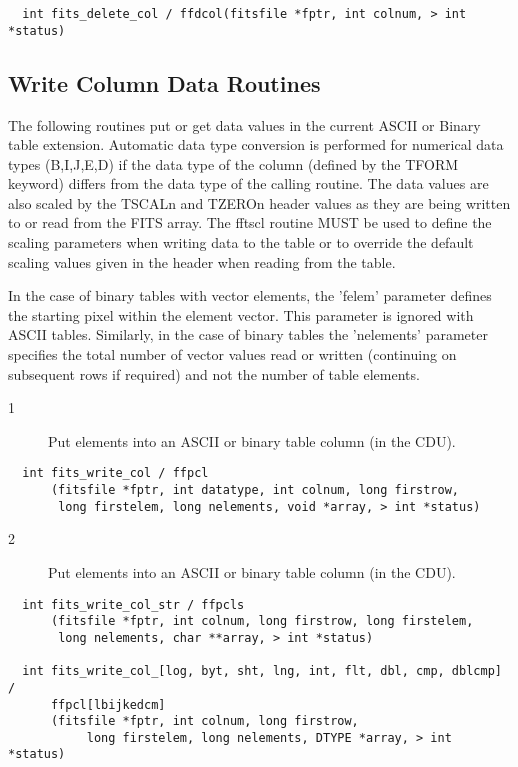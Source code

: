 \begin{verbatim}
  int fits_delete_col / ffdcol(fitsfile *fptr, int colnum, > int *status)
\end{verbatim}

\subsection{ Write Column Data Routines \label{FFPCLS}}

The following routines put or get data values in the current ASCII or
Binary table extension.  Automatic data type conversion is performed
for numerical data types (B,I,J,E,D) if the data type of the column
(defined by the TFORM keyword) differs from the data type of the
calling routine.  The data values are also scaled by the TSCALn and
TZEROn header values as they are being written to or read from the FITS
array.  The fftscl routine MUST be used to define the scaling
parameters when writing data to the table or to override the default
scaling values given in the header when reading from the table.

    In the case of binary tables with vector elements, the 'felem'
parameter defines the starting pixel within the element vector.  This
parameter is ignored with ASCII tables. Similarly, in the case of
binary tables the 'nelements' parameter specifies the total number of
vector values read or written (continuing on subsequent rows if
required) and not the number of table elements.


\begin{description}
\item[1 ] Put elements into an ASCII or binary table column (in the CDU).
\end{description}

\begin{verbatim}
  int fits_write_col / ffpcl
      (fitsfile *fptr, int datatype, int colnum, long firstrow,
       long firstelem, long nelements, void *array, > int *status)
\end{verbatim}

\begin{description}
\item[2 ] Put elements into an ASCII or binary table column (in the CDU).
\end{description}

\begin{verbatim}
  int fits_write_col_str / ffpcls
      (fitsfile *fptr, int colnum, long firstrow, long firstelem,
       long nelements, char **array, > int *status)

  int fits_write_col_[log, byt, sht, lng, int, flt, dbl, cmp, dblcmp] /
      ffpcl[lbijkedcm]
      (fitsfile *fptr, int colnum, long firstrow,
           long firstelem, long nelements, DTYPE *array, > int *status)
\end{verbatim}

